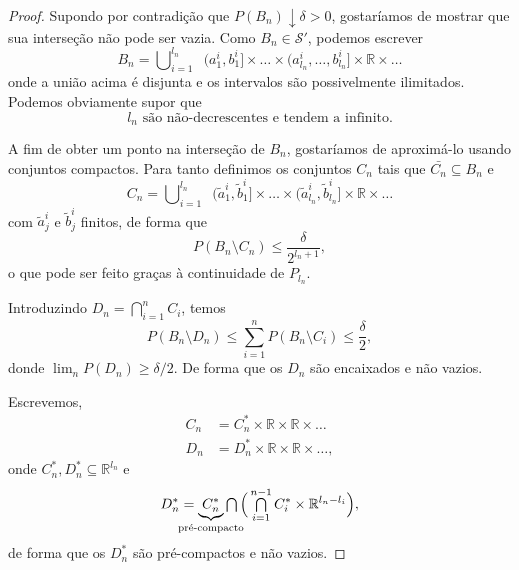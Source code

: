 \documentclass[reqno, draft]{book}
\def\widebar{\bar}
\newcommand*\1{\mathds{1}}
\DeclareMathOperator*{\mcup}{{\textstyle \bigcup}}
\DeclareMathOperator*{\mcap}{{\textstyle \bigcap}}
\def\clap#1{\hbox to 0pt{\hss#1\hss}}
\def\mathclap{\mathpalette\mathclapinternal}
\def\mathclapinternal#1#2{\clap{$\mathsurround=0pt#1{#2}$}}
\begin{document}
\begin{proof}
  Supondo por contradição que $P(B_n) \downarrow \delta > 0$, gostaríamos de mostrar que sua interseção não pode ser vazia.
  Como $B_n \in \mathcal{S}'$, podemos escrever
  \begin{equation}
    B_n = \mcup_{i=1}^{l_n} \;\; (a_1^i, b_1^i] \times \dots \times (a_{l_n}^i, \dots, b_{l_n}^i] \times \mathbb{R} \times \dots
  \end{equation}
  onde a união acima é disjunta e os intervalos são possivelmente ilimitados.
  Podemos obviamente supor que
  \begin{equation}
    \label{e:l_n_monotona}
    \text{$l_n$ são não-decrescentes e tendem a infinito.}
  \end{equation}

  A fim de obter um ponto na interseção de $B_n$, gostaríamos de aproximá-lo usando conjuntos compactos.
  Para tanto definimos os conjuntos $C_n$ tais que $\widebar{C_n} \subseteq B_n$ e
  \begin{equation}
    C_n = \mcup_{i=1}^{l_n} \;\; \big(\tilde a_1^i, \tilde b_1^i\big] \times \dots \times \big(\tilde a_{l_n}^i, \tilde b_{l_n}^i\big] \times \mathbb{R} \times \dots
  \end{equation}
  com $\tilde a_j^i$ e $\tilde b_j^i$ finitos, de forma que
  \begin{equation}
    P(B_n \setminus C_n) \leq \frac{\delta}{2^{l_n + 1}},
  \end{equation}
  o que pode ser feito graças à continuidade de $P_{l_n}$.


  Introduzindo $D_n = \bigcap_{i=1}^n C_i$, temos
  \begin{equation}
    P(B_n \setminus D_n) \leq \sum_{i=1}^n P(B_n \setminus C_i) \leq \frac{\delta}2,
  \end{equation}
  donde $\lim_n P(D_n) \geq \delta/2$.
  De forma que os $D_n$ são encaixados e não vazios.

  Escrevemos,
  \begin{equation}
    \begin{split}
      C_n & = C_n^* \times \mathbb{R} \times \mathbb{R} \times \dots\\
      D_n & = D_n^* \times \mathbb{R} \times \mathbb{R} \times \dots,
    \end{split}
  \end{equation}
  onde $C_n^*, D_n^* \subseteq \mathbb{R}^{l_n}$ e
  \begin{equation}
    D_n^* = \underbrace{C_n^*}_{\mathclap{\text{pré-compacto}}} \mcap \Big( \mcap_{i=1}^{n-1} C_i^* \times \mathbb{R}^{l_n - l_i} \Big),
  \end{equation}
  de forma que os $D_n^*$ são pré-compactos e não vazios.


\end{proof}
\end{document}
